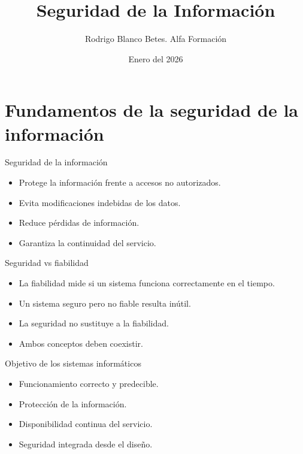 \documentclass{beamer}
\title{Seguridad de la Información}
\author{Rodrigo Blanco Betes. Alfa Formación}
\date{Enero del 2026}
\begin{document}
\begin{frame}
\titlepage
\end{frame}

\begin{frame}
\tableofcontents
\end{frame}


\section{Fundamentos de la seguridad de la información}

\begin{frame}{Seguridad de la información}
\begin{itemize}
    \item Protege la información frente a accesos no autorizados.
    \item Evita modificaciones indebidas de los datos.
    \item Reduce pérdidas de información.
    \item Garantiza la continuidad del servicio.
\end{itemize}
\end{frame}

\begin{frame}{Seguridad vs fiabilidad}
\begin{itemize}
    \item La fiabilidad mide si un sistema funciona correctamente en el tiempo.
    \item Un sistema seguro pero no fiable resulta inútil.
    \item La seguridad no sustituye a la fiabilidad.
    \item Ambos conceptos deben coexistir.
\end{itemize}
\end{frame}

\begin{frame}{Objetivo de los sistemas informáticos}
\begin{itemize}
    \item Funcionamiento correcto y predecible.
    \item Protección de la información.
    \item Disponibilidad continua del servicio.
    \item Seguridad integrada desde el diseño.
\end{itemize}
\end{frame}
\end{document}

